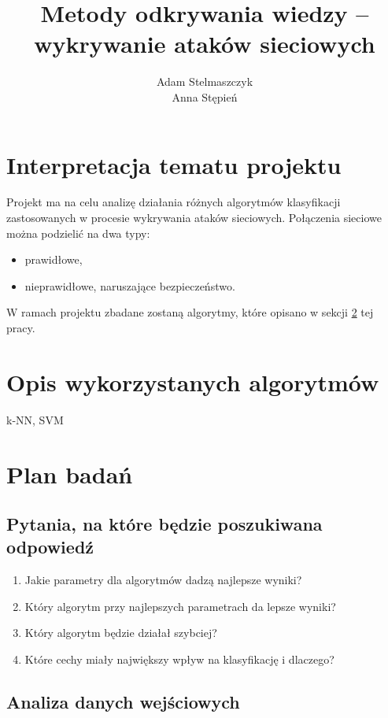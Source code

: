 \documentclass[a4paper, 12pt]{article}
\title{Metody odkrywania wiedzy -- wykrywanie ataków sieciowych}
\author{Adam Stelmaszczyk\\ Anna Stępień}
\begin{document}
\maketitle

\tableofcontents

\newpage

\section{Interpretacja tematu projektu}
Projekt ma na celu analizę działania różnych algorytmów klasyfikacji zastosowanych
w procesie wykrywania ataków sieciowych. Połączenia sieciowe można podzielić na dwa typy:
\begin{itemize}
	\item prawidłowe,
	\item nieprawidłowe, naruszające bezpieczeństwo.
\end{itemize}
W ramach projektu zbadane zostaną algorytmy, które opisano w sekcji \ref{algorithms} 
tej pracy.

\section{Opis wykorzystanych algorytmów}\label{algorithms}

k-NN, SVM

\section{Plan badań}

\subsection{Pytania, na które będzie poszukiwana odpowiedź}

\begin{enumerate}
 \item Jakie parametry dla algorytmów dadzą najlepsze wyniki?
 \item Który algorytm przy najlepszych parametrach da lepsze wyniki?
 \item Który algorytm będzie działał szybciej?
 \item Które cechy miały największy wpływ na klasyfikację i dlaczego?
\end{enumerate}

\subsection{Analiza danych wejściowych}
\end{document}
